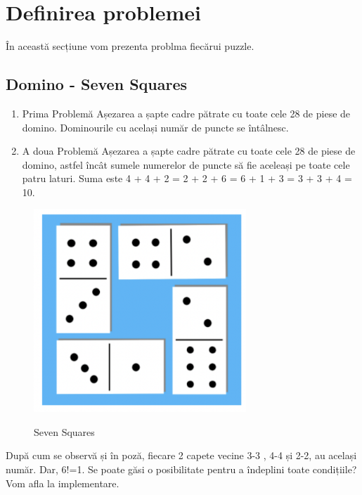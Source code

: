 \section{Definirea problemei}
În această secțiune vom prezenta problma fiecărui puzzle.
\newline


\subsection{Domino - Seven Squares}

\begin{enumerate}
    \item Prima Problemă\newline\newline
 Așezarea a șapte cadre pătrate cu toate cele 28 de piese de domino. Dominourile cu același număr de puncte se întâlnesc.\newline
    \item A doua Problemă\newline\newline
Așezarea a șapte cadre pătrate cu toate cele 28 de piese de domino, astfel încât sumele numerelor de puncte să fie aceleași pe toate cele patru laturi. \newline
Suma este 4 + 4 + 2 = 2 + 2 + 6 = 6 + 1 + 3 = 3 + 3 + 4 = 10.\newline
\end{enumerate}

\begin{figure}[h]
    \centering
    \includegraphics[width=8cm]{text/images/pic3.png}\\
    \caption{Seven Squares}
\end{figure} \newline
După cum se observă și în poză, fiecare 2 capete vecine 3-3 , 4-4 și 2-2, au același număr. Dar, 6!=1.
Se poate găsi o posibilitate pentru a îndeplini toate condițiile?
Vom afla la implementare.

